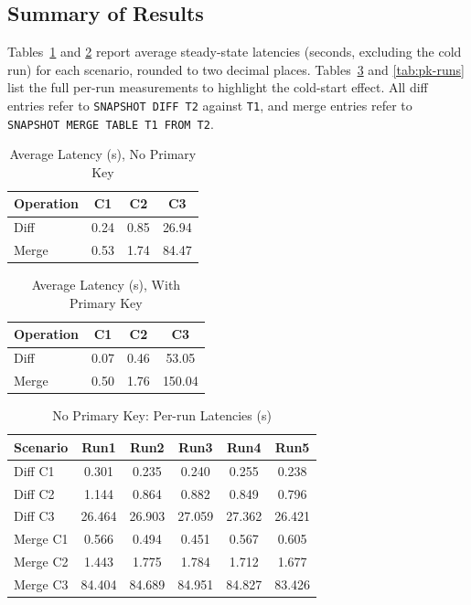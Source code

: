 \documentclass[sigconf,nonacm]{acmart} %
\begin{document}
\subsection{Summary of Results}
Tables~\ref{tab:latency-nopk} and \ref{tab:latency-pk} report average
steady-state latencies (seconds, excluding the cold run) for each
scenario, rounded to two decimal places.  Tables~\ref{tab:nopk-runs} and
\ref{tab:pk-runs} list the full per-run measurements to highlight the
cold-start effect.  All
diff entries refer to \texttt{SNAPSHOT DIFF T2} against \texttt{T1}, and
merge entries refer to \texttt{SNAPSHOT MERGE TABLE T1 FROM T2}.

\begin{table}[h]
  \centering
  \caption{Average Latency (s), No Primary Key}
  \label{tab:latency-nopk}
  \begin{tabular}{lccc}
    \toprule
    \textbf{Operation} & \textbf{C1} & \textbf{C2} & \textbf{C3} \\
    \midrule
    Diff  & 0.24 & 0.85 & 26.94 \\
    Merge & 0.53 & 1.74 & 84.47 \\
    \bottomrule
  \end{tabular}
\end{table}

\begin{table}[h]
  \centering
  \caption{Average Latency (s), With Primary Key}
  \label{tab:latency-pk}
  \begin{tabular}{lccc}
    \toprule
    \textbf{Operation} & \textbf{C1} & \textbf{C2} & \textbf{C3} \\
    \midrule
    Diff  & 0.07 & 0.46 & 53.05 \\
    Merge & 0.50 & 1.76 & 150.04 \\
    \bottomrule
  \end{tabular}
\end{table}

\begin{table}[h]
  \centering
  \caption{No Primary Key: Per-run Latencies (s)}
  \label{tab:nopk-runs}
  \begin{tabular}{lccccc}
    \toprule
    Scenario & Run1 & Run2 & Run3 & Run4 & Run5 \\
    \midrule
    Diff C1  & 0.301 & 0.235 & 0.240 & 0.255 & 0.238 \\
    Diff C2  & 1.144 & 0.864 & 0.882 & 0.849 & 0.796 \\
    Diff C3  & 26.464 & 26.903 & 27.059 & 27.362 & 26.421 \\
    Merge C1 & 0.566 & 0.494 & 0.451 & 0.567 & 0.605 \\
    Merge C2 & 1.443 & 1.775 & 1.784 & 1.712 & 1.677 \\
    Merge C3 & 84.404 & 84.689 & 84.951 & 84.827 & 83.426 \\
    \bottomrule
  \end{tabular}
\end{table}
\end{document}
